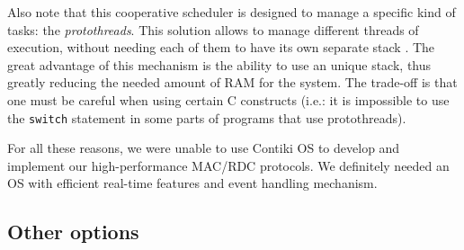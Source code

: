 \documentclass[a4paper,twoside]{article}
\begin{document}
Also note that this cooperative scheduler is designed to manage a specific
kind of tasks: the \emph{protothreads}. This solution allows to manage
different threads of execution, without needing each of them to have
its own separate stack \cite{Protothreads}. The great advantage of
this mechanism is the ability to use an unique stack, thus greatly
reducing the needed amount of RAM for the system. The trade-off is
that one must be careful when using certain C constructs (i.e.:
it is impossible to use the \texttt{switch} statement in
some parts of programs that use protothreads).

For all these reasons, we were unable to use Contiki OS to develop and
implement our high-performance MAC/RDC protocols. We definitely needed
an OS with efficient real-time features and event handling mechanism.

\subsection{Other options}
\end{document}
